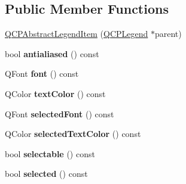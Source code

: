 \subsection*{Public Member Functions}
\begin{DoxyCompactItemize}
\item 
\hyperlink{classQCPAbstractLegendItem_afaff87610e8da0fa238ecf552872d774}{Q\-C\-P\-Abstract\-Legend\-Item} (\hyperlink{classQCPLegend}{Q\-C\-P\-Legend} $\ast$parent)
\item 
\hypertarget{classQCPAbstractLegendItem_ad7058296a6078bc5c248f34a2757cc2a}{bool {\bfseries antialiased} () const }\label{classQCPAbstractLegendItem_ad7058296a6078bc5c248f34a2757cc2a}

\item 
\hypertarget{classQCPAbstractLegendItem_ae476404706638d84fadc01021df2b19e}{Q\-Font {\bfseries font} () const }\label{classQCPAbstractLegendItem_ae476404706638d84fadc01021df2b19e}

\item 
\hypertarget{classQCPAbstractLegendItem_a444caef8565ac8d8653269f14d82b42d}{Q\-Color {\bfseries text\-Color} () const }\label{classQCPAbstractLegendItem_a444caef8565ac8d8653269f14d82b42d}

\item 
\hypertarget{classQCPAbstractLegendItem_afccfe665eb8483cec924a9c0a53ddf2b}{Q\-Font {\bfseries selected\-Font} () const }\label{classQCPAbstractLegendItem_afccfe665eb8483cec924a9c0a53ddf2b}

\item 
\hypertarget{classQCPAbstractLegendItem_a076db1717257b82875b12a15ecf99ba3}{Q\-Color {\bfseries selected\-Text\-Color} () const }\label{classQCPAbstractLegendItem_a076db1717257b82875b12a15ecf99ba3}

\item 
\hypertarget{classQCPAbstractLegendItem_a0a0205f33f37edae50826c24cb8f1983}{bool {\bfseries selectable} () const }\label{classQCPAbstractLegendItem_a0a0205f33f37edae50826c24cb8f1983}

\item 
\hypertarget{classQCPAbstractLegendItem_ac776e68e3367704452131c6aa9908bb9}{bool {\bfseries selected} () const }\label{classQCPAbstractLegendItem_ac776e68e3367704452131c6aa9908bb9}


\end{DoxyCompactItemize}

